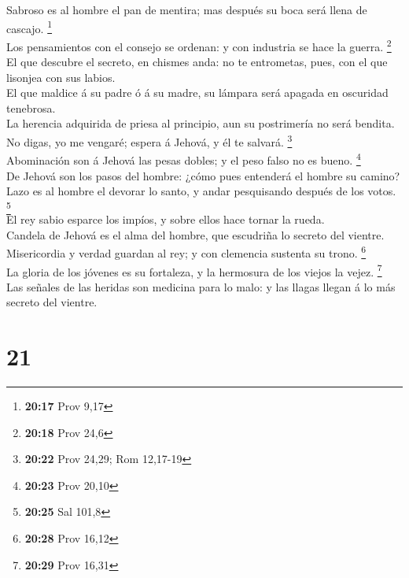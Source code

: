  Sabroso es al hombre el pan de mentira; mas después su
boca será llena de cascajo. \footnote{\textbf{20:17} Prov 9,17}\\
 Los pensamientos con el consejo se ordenan: y con
industria se hace la guerra. \footnote{\textbf{20:18} Prov 24,6}\\
 El que descubre el secreto, en chismes anda: no te
entrometas, pues, con el que lisonjea con sus labios.\\
 El que maldice á su padre ó á su madre, su lámpara será
apagada en oscuridad tenebrosa.\\
 La herencia adquirida de priesa al principio, aun su
postrimería no será bendita.\\
 No digas, yo me vengaré; espera á Jehová, y él te salvará.
\footnote{\textbf{20:22} Prov 24,29; Rom 12,17-19}\\
 Abominación son á Jehová las pesas dobles; y el peso falso
no es bueno. \footnote{\textbf{20:23} Prov 20,10}\\
 De Jehová son los pasos del hombre: ¿cómo pues entenderá
el hombre su camino?\\
 Lazo es al hombre el devorar lo santo, y andar pesquisando
después de los votos. \footnote{\textbf{20:25} Sal 101,8}\\
 El rey sabio esparce los impíos, y sobre ellos hace tornar
la rueda.\\
 Candela de Jehová es el alma del hombre, que escudriña lo
secreto del vientre.\\
 Misericordia y verdad guardan al rey; y con clemencia
sustenta su trono. \footnote{\textbf{20:28} Prov 16,12}\\
 La gloria de los jóvenes es su fortaleza, y la hermosura
de los viejos la vejez. \footnote{\textbf{20:29} Prov 16,31}\\
 Las señales de las heridas son medicina para lo malo: y
las llagas llegan á lo más secreto del vientre.

\hypertarget{section-20}{%
\section{21}\label{section-20}}

